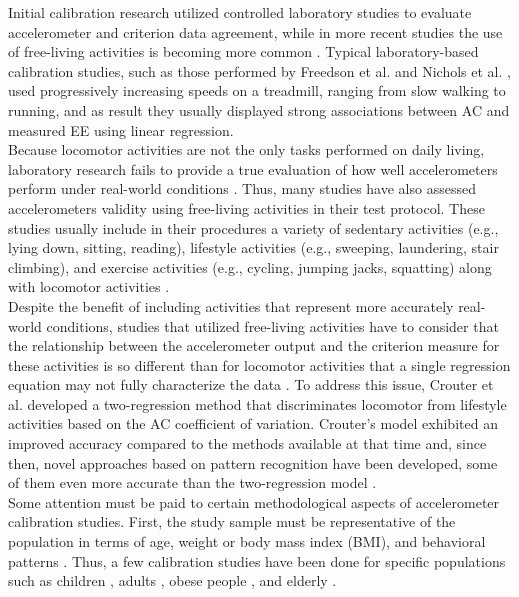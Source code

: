 \documentclass[11pt]{article}
\begin{document}
Initial calibration research utilized controlled laboratory studies to evaluate accelerometer and criterion data agreement, while in more recent studies the use of free-living activities is becoming more common \cite{Welk_2005, Matthews_2005}. Typical laboratory-based calibration studies, such as those performed by Freedson et al. \citeyear{Freedson_1998} and Nichols et al. \citeyear{Nichols_1999}, used progressively increasing speeds on a treadmill, ranging from slow walking to running, and as result they usually displayed strong associations between AC and measured EE using linear regression. \\

Because locomotor activities are not the only tasks performed on daily living, laboratory research fails to provide a true evaluation of how well accelerometers perform under real-world conditions \cite{Welk_2005}. Thus, many studies have also assessed accelerometers validity using free-living activities in their test protocol. These studies usually include in their procedures a variety of sedentary activities (e.g., lying down, sitting, reading), lifestyle activities (e.g., sweeping, laundering, stair climbing), and exercise activities (e.g., cycling, jumping jacks, squatting) along with locomotor activities \cite{Montoye_2015, Montoye_2016b}. \\

Despite the benefit of including activities that represent more accurately real-world conditions, studies that utilized free-living activities have to consider that the relationship between the accelerometer output and the criterion measure for these activities is so different than for locomotor activities that a single regression equation may not fully characterize the data \cite{Welk_2005}. To address this issue, Crouter et al. \citeyear{Crouter_2006} developed a two-regression method that discriminates locomotor from lifestyle activities based on the AC coefficient of variation. Crouter's model exhibited an improved accuracy compared to the methods available at that time and, since then, novel approaches based on pattern recognition have been developed, some of them even more accurate than the two-regression model \cite{Farrahi_2019, Basset_2012}. \\

Some attention must be paid to certain methodological aspects of accelerometer calibration studies. First, the study sample must be representative of the population in terms of age, weight or body mass index (BMI), and behavioral patterns \cite{Welk_2005}. Thus, a few calibration studies have been done for specific populations such as children \cite{Phillips_2013, McMurray_2016}, adults \cite{Freedson_1998, Hibbing_2018}, obese people \cite{Aadland_2012}, and elderly \cite{Evenson_2015}. \\
\end{document}
